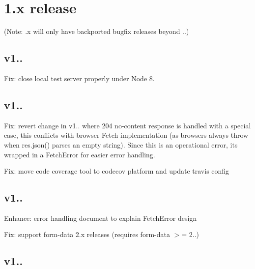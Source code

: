 \section*{1.\+x release}

(Note\+: {.\+x} will only have backported bugfix releases beyond {..})

\subsection*{v1..}


\begin{DoxyItemize}
\item Fix\+: close local test server properly under Node 8.
\end{DoxyItemize}

\subsection*{v1..}


\begin{DoxyItemize}
\item Fix\+: revert change in {\ttfamily v1..} where 204 no-\/content response is handled with a special case, this conflicts with browser Fetch implementation (as browsers always throw when res.\+json() parses an empty string). Since this is an operational error, it\textquotesingle{}s wrapped in a {\ttfamily Fetch\+Error} for easier error handling.
\item Fix\+: move code coverage tool to codecov platform and update travis config
\end{DoxyItemize}

\subsection*{v1..}


\begin{DoxyItemize}
\item Enhance\+: error handling document to explain {\ttfamily Fetch\+Error} design
\item Fix\+: support {\ttfamily form-\/data} 2.\+x releases (requires {\ttfamily form-\/data} $>$= 2..)
\end{DoxyItemize}

\subsection*{v1..}


